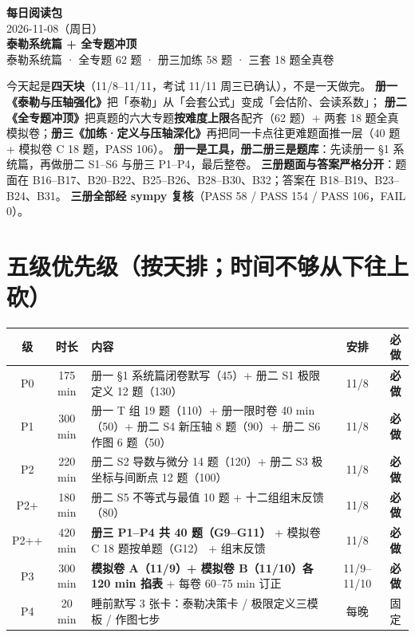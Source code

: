\documentclass[10pt,a4paper]{ctexart}
\begin{document}
\clearpage

\begin{center}
{\Huge\bfseries 每日阅读包}\\[0.25em]
{\LARGE 2026-11-08（周日）}\\[0.45em]
{\Large\bfseries 泰勒系统篇 + 全专题冲顶}\\[0.3em]
{\normalsize 泰勒系统篇 · 全专题 62 题 · 册三加练 58 题 · 三套 18 题全真卷}
\end{center}
\vspace{0.4em}
\begin{keypoint}[今天的一句话]
今天起是\textbf{四天块}（11/8--11/11，考试 11/11 周三已确认），不是一天做完。
\textbf{册一《泰勒与压轴强化》}把「泰勒」从「会套公式」变成「会估阶、会读系数」；
\textbf{册二《全专题冲顶》}把真题的六大专题\textbf{按难度上限}各配齐（62 题）+ 两套 18 题全真模拟卷；\textbf{册三《加练·定义与压轴深化》}再把同一卡点往更难题面推一层（40 题 + 模拟卷 C 18 题，PASS 106）。
\textbf{册一是工具，册二册三是题库}：先读册一 §1 系统篇，再做册二 S1--S6 与册三 P1--P4，最后整卷。
\textbf{三册题面与答案严格分开}：题面在 B16--B17、B20--B22、B25--B26、B28--B30、B32；答案在 B18--B19、B23--B24、B31。
\textbf{三册全部经 sympy 复核}（PASS 58 / PASS 154 / PASS 106，FAIL 0）。
\end{keypoint}

\section*{五级优先级（按天排；时间不够从下往上砍）}
\begin{tabularx}{\linewidth}{c|c|p{6.4cm}|c|c}
\toprule
级 & 时长 & 内容 & 安排 & 必做 \\
\midrule
P0 & 175 min & 册一 §1 系统篇闭卷默写（45）+ 册二 S1 极限定义 12 题（130） & 11/8 & \textbf{必做} \\
P1 & 300 min & 册一 T 组 19 题（110）+ 册一限时卷 40 min（50）+ 册二 S4 新压轴 8 题（90）+ 册二 S6 作图 6 题（50） & 11/8 & \textbf{必做} \\
P2 & 220 min & 册二 S2 导数与微分 14 题（120）+ 册二 S3 极坐标与间断点 12 题（100） & 11/8 & \textbf{必做} \\
P2+ & 180 min & 册二 S5 不等式与最值 10 题 + 十二组组末反馈（80） & 11/8 & \textbf{必做} \\
P2++ & 420 min & \textbf{册三 P1--P4 共 40 题（G9--G11）} + 模拟卷 C 18 题按单题（G12） + 组末反馈 & 11/8 & \textbf{必做} \\
P3 & 300 min & \textbf{模拟卷 A（11/9）+ 模拟卷 B（11/10）各 120 min 掐表} + 每卷 60--75 min 订正 & 11/9--11/10 & \textbf{必做} \\
P4 & 20 min & 睡前默写 3 张卡：泰勒决策卡 / 极限定义三模板 / 作图七步 & 每晚 & 固定 \\
\bottomrule
\end{tabularx}
\end{document}
